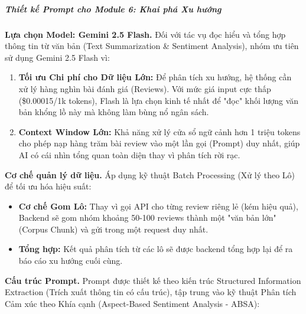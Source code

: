 \subparagraph{Thiết kế Prompt cho Module 6: Khai phá Xu hướng}

\textbf{Lựa chọn Model: Gemini 2.5 Flash.} Đối với tác vụ đọc hiểu và tổng hợp thông tin từ văn bản (Text Summarization \& Sentiment Analysis), nhóm ưu tiên sử dụng Gemini 2.5 Flash vì:

\begin{enumerate}[label=\arabic*., leftmargin=*]
    \item \textbf{Tối ưu Chi phí cho Dữ liệu Lớn:} Để phân tích xu hướng, hệ thống cần xử lý hàng nghìn bài đánh giá (Reviews). Với mức giá input cực thấp (\$0.00015/1k tokens), Flash là lựa chọn kinh tế nhất để "đọc" khối lượng văn bản khổng lồ này mà không làm bùng nổ ngân sách.
    
    \item \textbf{Context Window Lớn:} Khả năng xử lý cửa sổ ngữ cảnh hơn 1 triệu tokens cho phép nạp hàng trăm bài review vào một lần gọi (Prompt) duy nhất, giúp AI có cái nhìn tổng quan toàn diện thay vì phân tích rời rạc.
\end{enumerate}

\textbf{Cơ chế quản lý dữ liệu.} Áp dụng kỹ thuật Batch Processing (Xử lý theo Lô) để tối ưu hóa hiệu suất:

\begin{itemize}
    \item \textbf{Cơ chế Gom Lô:} Thay vì gọi API cho từng review riêng lẻ (kém hiệu quả), Backend sẽ gom nhóm khoảng 50-100 reviews thành một "văn bản lớn" (Corpus Chunk) và gửi trong một request duy nhất.
    \item \textbf{Tổng hợp:} Kết quả phân tích từ các lô sẽ được backend tổng hợp lại để ra báo cáo xu hướng cuối cùng.
\end{itemize}

\textbf{Cấu trúc Prompt.} Prompt được thiết kế theo kiến trúc Structured Information Extraction (Trích xuất thông tin có cấu trúc), tập trung vào kỹ thuật Phân tích Cảm xúc theo Khía cạnh (Aspect-Based Sentiment Analysis - ABSA):

